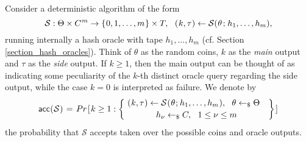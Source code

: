 \documentclass{iacrtrans}
\begin{document}
Consider a deterministic algorithm of the form
\vspace{5pt}
\begin{equation}\label{local_forking_s_form}
\mathcal{S}: \Theta \times C^{\hspace{0.5pt}m} \rightarrow
\{\hspace{0.5pt}0, 1, \dots, m\hspace{0.5pt}\} \times T,
\ \ (
	\hspace{0.5pt}
	k,
	\tau
	\hspace{0.2pt}
)
\leftarrow
\mathcal{S}(
	\hspace{0.4pt}
	\theta
	\hspace{1pt}
	;
	\hspace{1pt}
	h_1,
	\dots,
	h_m
	\hspace{0.0pt}
),
\vspace{5pt}
\end{equation}
running internally a hash oracle
with tape $h_1, \dots, h_m$
(cf. Section \ref{section_hash_oracles}).
Think of $\theta$ as the random coins,
$k$ as the \textit{main} output and
$\tau$ as the \textit{side} output.
If $k \ge 1$, then the main output can be thought of as indicating
some peculiarity of the $k$-th distinct
oracle query regarding the side output,
while the case $k = 0$ is interpreted as failure.
We denote by
\vspace{6pt}
\begin{equation}\label{local_forking_acc}
\mathsf{acc}
	\hspace{0.3pt}
	(
		\hspace{0.3pt}
		\mathcal{S}
		\hspace{0.3pt}
	)
\hspace{1pt}
=
\hspace{1pt}
Pr\hspace{1pt}[\hspace{1pt}k \ge 1 :
\begin{Bmatrix}
\ (
	\hspace{0.4pt}
	k,
	\tau
	\hspace{0.2pt}
)
\leftarrow
\mathcal{S}
	\hspace{0.5pt}
	(
		\hspace{0.5pt}
		\theta
		\hspace{0.5pt}
		;
		\hspace{0.5pt}
		h_1,
		\dots,
		h_m
		\hspace{0.5pt}
	),
\ \ \theta \leftarrow_\$ \Theta\ \ \ \\[2pt]
h_\nu \leftarrow_\$ C,
\ \ 1 \le \nu \le m
\end{Bmatrix}
\hspace{1pt}]\\[6pt]
\end{equation}
the probability that $\mathcal{S}$ accepts
taken over the possible coins and oracle outputs.
\end{document}
